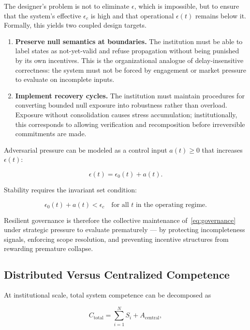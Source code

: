 \documentclass[11pt]{article}
\theoremstyle{remark}
\begin{document}
The designer's problem is not to eliminate $\epsilon$, which is impossible, but to ensure that the system's effective $\epsilon_c$ is high and that operational $\epsilon(t)$ remains below it. Formally, this yields two coupled design targets.

\begin{enumerate}
  \item \textbf{Preserve null semantics at boundaries.} The institution must be able to label states as not-yet-valid and refuse propagation without being punished by its own incentives. This is the organizational analogue of delay-insensitive correctness: the system must not be forced by engagement or market pressure to evaluate on incomplete inputs.

  \item \textbf{Implement recovery cycles.} The institution must maintain procedures for converting bounded null exposure into robustness rather than overload. Exposure without consolidation causes stress accumulation; institutionally, this corresponds to allowing verification and recomposition before irreversible commitments are made.
\end{enumerate}

Adversarial pressure can be modeled as a control input $a(t) \geq 0$ that increases $\epsilon(t)$:

\[
\epsilon(t) = \epsilon_0(t) + a(t).
\]

Stability requires the invariant set condition:

\begin{equation}
\epsilon_0(t) + a(t) < \epsilon_c \quad \text{for all } t \text{ in the operating regime.}
\label{eq:governance}
\end{equation}

Resilient governance is therefore the collective maintenance of~\eqref{eq:governance} under strategic pressure to evaluate prematurely — by protecting incompleteness signals, enforcing scope resolution, and preventing incentive structures from rewarding premature collapse.

\subsection{Distributed Versus Centralized Competence}

At institutional scale, total system competence can be decomposed as

\[
C_{\text{total}} = \sum_{i=1}^N S_i + A_{\text{central}},
\]
\end{document}
